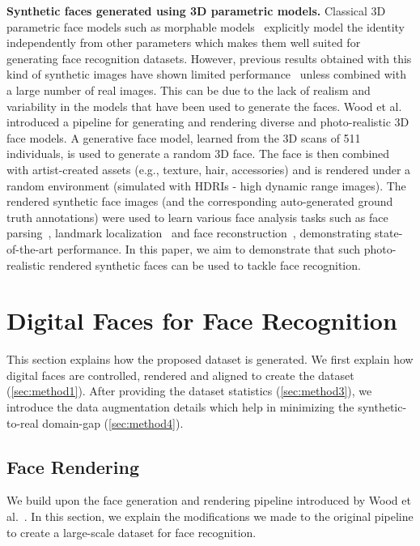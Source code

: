 \documentclass[10pt,twocolumn,letterpaper]{article}
\begin{document}
\noindent
\textbf{Synthetic faces generated using 3D parametric models.} Classical 3D parametric face models such as morphable models~\cite{Blanz1999AMM} explicitly model the identity independently from other parameters which makes them well suited for generating face recognition datasets. However, previous results obtained with this kind of synthetic images have shown limited performance~\cite{2019_Kortylewski,2018_undo_bias} unless combined with a large number of real images. This can be due to the lack of realism and variability in the models that have been used to generate the faces.
Wood et al.~\cite{2021_FakeItMakeIt} introduced a pipeline for generating and rendering diverse and photo-realistic 3D face models. A generative face model, learned from the 3D scans of 511 individuals, is used to generate a random 3D face. The face is then combined with artist-created assets (e.g., texture, hair, accessories) and is rendered under a random environment (simulated with HDRIs - high dynamic range images). The rendered synthetic face images (and the corresponding auto-generated ground truth annotations) were used to learn various face analysis tasks such as face parsing~\cite{2021_FakeItMakeIt}, landmark localization~\cite{2021_FakeItMakeIt,2022_dense_landmarks_are_all_u_need} and face reconstruction~\cite{2022_dense_landmarks_are_all_u_need}, demonstrating state-of-the-art performance. In this paper, we aim to demonstrate that such photo-realistic rendered synthetic faces can be used to tackle face recognition.

\section{Digital Faces for Face Recognition}

This section explains how the proposed dataset is generated.
We first explain how digital faces are controlled, rendered and aligned to create the dataset (\autoref{sec:method1}). 
After providing the dataset statistics (\autoref{sec:method3}), we introduce the data augmentation details which help in minimizing the synthetic-to-real domain-gap (\autoref{sec:method4}).

\subsection{Face Rendering}
\label{sec:method1}

We build upon the face generation and rendering pipeline introduced by Wood et al.~\cite{2021_FakeItMakeIt}. 
In this section, we explain the modifications we made to the original pipeline to create a large-scale dataset for face recognition.
\end{document}
